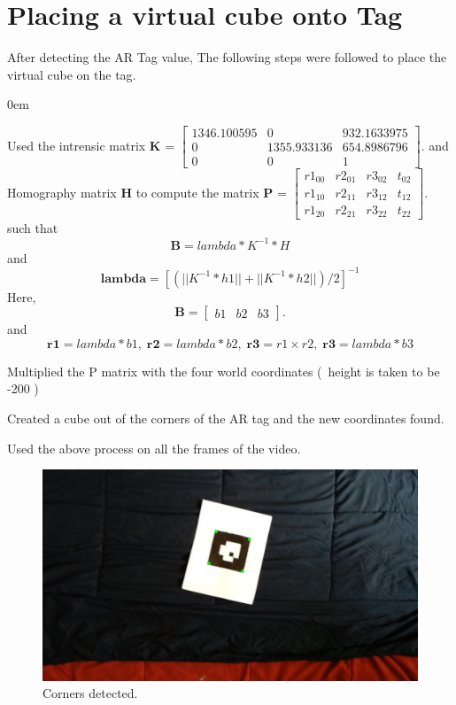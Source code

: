 \documentclass[11pt]{article}
\begin{document}
\section{Placing a virtual cube onto Tag}
After detecting the AR Tag value, The following steps were followed to place the virtual cube on the tag.
\begin{description}
\addtolength{\itemindent}{0.80cm}
\itemsep0em 
\item[1.] Used the intrensic matrix \textbf{K} = 
			$\begin{bmatrix}
			1346.100595 & 0 & 932.1633975 \\
			0 & 1355.933136 & 654.8986796\\
			0 & 0 & 1
			\end{bmatrix}$.
 and Homography matrix \textbf{H} to compute the matrix \textbf{P} = 
			$\begin{bmatrix}
			r1_{00} & r2_{01} & r3_{02} & t_{02}\\
			r1_{10} & r2_{11} & r3_{12} & t_{12}\\
			r1_{20} & r2_{21} & r3_{22} & t_{22}
			\end{bmatrix}$.
			such that \[\textbf{B} = lambda*K^{-1}*H\] and 
			\[\textbf{lambda} = [(||K^{-1}*h1|| + ||K^{-1}*h2||)/2]^{-1}\]
			Here,  \[\textbf{B} = \begin{bmatrix} 
									b1 & b2 & b3
									\end{bmatrix}. \] and 
									\[\textbf{r1} = lambda*b1,\; \textbf{r2} 										= lambda*b2,\; \textbf{r3} = r1\times r2,\; \textbf{r3} = lambda*b3\] 
\item[2.] Multiplied the P matrix with the four world coordinates (\ height is taken to be -200 )\
\item[3.] Created a cube out of the corners of the AR tag and the new coordinates found.
\item[4.] Used the above process on all the frames of the video.
\begin{figure}[!htbp]
  \centering
	\includegraphics[width=1\textwidth]{Corners}
	\caption{Corners detected.}
\end{figure}


\end{description}
\end{document}
